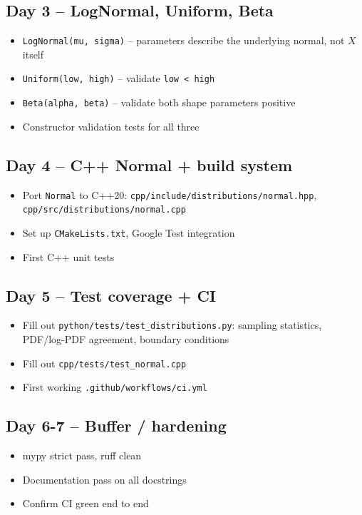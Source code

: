 \documentclass[11pt]{article}
\begin{document}
\subsection*{Day 3 -- LogNormal, Uniform, Beta}
\begin{itemize}[leftmargin=*]
  \item \texttt{LogNormal(mu, sigma)} -- parameters describe the
    underlying normal, not $X$ itself
  \item \texttt{Uniform(low, high)} -- validate \texttt{low < high}
  \item \texttt{Beta(alpha, beta)} -- validate both shape parameters
    positive
  \item Constructor validation tests for all three
\end{itemize}

\subsection*{Day 4 -- C++ Normal + build system}
\begin{itemize}[leftmargin=*]
  \item Port \texttt{Normal} to C++20: \texttt{cpp/include/distributions/normal.hpp},
    \texttt{cpp/src/distributions/normal.cpp}
  \item Set up \texttt{CMakeLists.txt}, Google Test integration
  \item First C++ unit tests
\end{itemize}

\subsection*{Day 5 -- Test coverage + CI}
\begin{itemize}[leftmargin=*]
  \item Fill out \texttt{python/tests/test\_distributions.py}: sampling
    statistics, PDF/log-PDF agreement, boundary conditions
  \item Fill out \texttt{cpp/tests/test\_normal.cpp}
  \item First working \texttt{.github/workflows/ci.yml}
\end{itemize}

\subsection*{Day 6-7 -- Buffer / hardening}
\begin{itemize}[leftmargin=*]
  \item mypy strict pass, ruff clean
  \item Documentation pass on all docstrings
  \item Confirm CI green end to end
\end{itemize}
\end{document}
